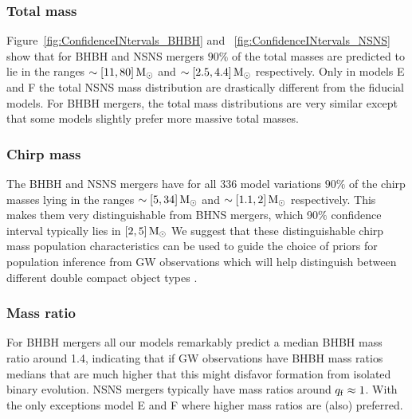 \documentclass[twocolumn]{aastex63}
\newcommand\bhnsSingle{BHNS\xspace}
\newcommand{\Msun}{\ensuremath{\,\rm{M}_{\odot}}\xspace}
\newcommand{\qf}{\ensuremath{q_{\rm{f}}}\xspace}
\newcommand{\Nmodels}{\ensuremath{336}\xspace}
\begin{document}
%
%


\subsubsection{Total mass}
%
Figure~\ref{fig:ConfidenceINtervals_BHBH} and ~\ref{fig:ConfidenceINtervals_NSNS} show that   for \ac{BHBH} and \ac{NSNS} mergers   $90\%$ of the total masses are predicted to lie in the ranges $\sim[11, 80]\Msun$ and  $\sim[2.5, 4.4]\Msun$ respectively. Only in models E and F the total \ac{NSNS} mass distribution are drastically different from the fiducial models. For \ac{BHBH} mergers, the total mass distributions are very similar except that some models slightly prefer more massive total masses. 

\subsubsection{Chirp mass}
%
The \ac{BHBH} and \ac{NSNS} mergers have for all \Nmodels model variations $90\%$ of the chirp masses lying in the ranges $\sim[5, 34]\Msun$ and $\sim[1.1, 2]\Msun$ respectively. This makes them very distinguishable from \bhnsSingle mergers, which 90$\%$ confidence interval typically lies in  $[2,5]\Msun$ We suggest that these distinguishable chirp mass population characteristics can be used to guide the choice of priors for population inference from \ac{GW} observations which will help distinguish between different double compact object types \citep[c.f.][]{2013ApJ...766L..14H,2015ApJ...807L..24L,2015MNRAS.450L..85M,2018ApJ...856..110Y}.




\subsubsection{Mass ratio}
For \ac{BHBH} mergers all our models remarkably predict a median \ac{BHBH} mass ratio around 1.4, indicating that if \ac{GW} observations have \ac{BHBH} mass ratios medians that are much higher that this might disfavor formation from isolated binary evolution. \ac{NSNS} mergers typically have mass ratios around $\qf \approx 1$. With the only exceptions model E and F where higher mass ratios are (also) preferred. 
\end{document}
